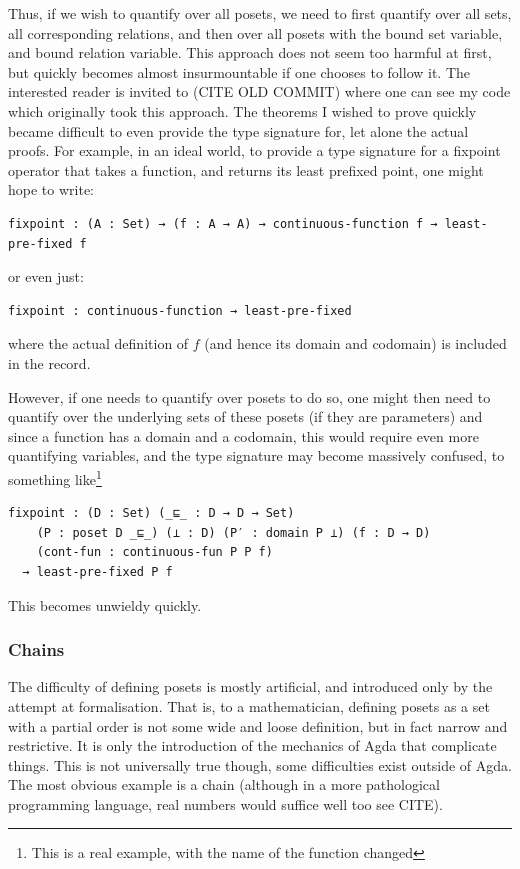 \documentclass[12pt,a4paper,twoside,openright]{report}
\begin{document}
Thus, if we wish to quantify over all posets, we need to first quantify over all sets, all corresponding relations, and then over all posets with the bound set variable, and bound relation variable. This approach does not seem too harmful at first, but quickly becomes almost insurmountable if one chooses to follow it. The interested reader is invited to (CITE OLD COMMIT) where one can see my code which originally took this approach. The theorems I wished to prove quickly became difficult to even provide the type signature for, let alone the actual proofs. For example, in an ideal world, to provide a type signature for a fixpoint operator that takes a function, and returns its least prefixed point, one might hope to write:
\begin{verbatim}
fixpoint : (A : Set) → (f : A → A) → continuous-function f → least-pre-fixed f
\end{verbatim}
or even just:
\begin{verbatim}
fixpoint : continuous-function → least-pre-fixed
\end{verbatim}
where the actual definition of $f$ (and hence its domain and codomain) is included in the record. 

However, if one needs to quantify over posets to do so, one might then need to quantify over the underlying sets of these posets (if they are parameters) and since a function has a domain and a codomain, this would require even more quantifying variables, and the type signature may become massively confused, to something like\footnote{This is a real example, with the name of the function changed}
\begin{verbatim}
fixpoint : (D : Set) (_⊑_ : D → D → Set) 
    (P : poset D _⊑_) (⊥ : D) (P′ : domain P ⊥) (f : D → D) 
    (cont-fun : continuous-fun P P f) 
  → least-pre-fixed P f
\end{verbatim}

This becomes unwieldy quickly. 
\subsubsection{Chains}
The difficulty of defining posets is mostly artificial, and introduced only by the attempt at formalisation. That is, to a mathematician, defining posets as a set with a partial order is not some wide and loose definition, but in fact narrow and restrictive. It is only the introduction of the mechanics of Agda that complicate things. This is not universally true though, some difficulties exist outside of Agda. The most obvious example is a chain (although in a more pathological programming language, real numbers would suffice well too see CITE). 
\end{document}
